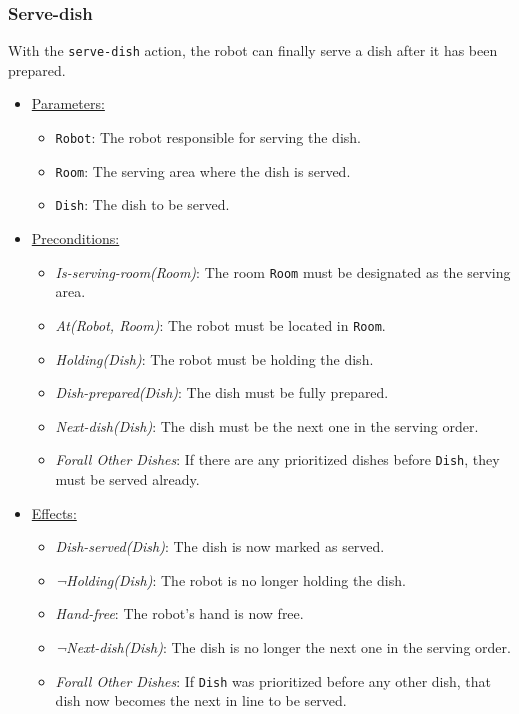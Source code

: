 \documentclass{article}
\begin{document}
\subsubsection{Serve-dish}
With the \texttt{serve-dish} action, the robot can finally serve a dish after it has been prepared.
\begin{itemize}
    \item \underline{Parameters:}
    \begin{itemize}
        \item \texttt{Robot}: The robot responsible for serving the dish.
        \item \texttt{Room}: The serving area where the dish is served.
        \item \texttt{Dish}: The dish to be served.
    \end{itemize}
    \item \underline{Preconditions:}
    \begin{itemize}
        \item \textit{Is-serving-room(Room)}: The room \texttt{Room} must be designated as the serving area.
        \item \textit{At(Robot, Room)}: The robot must be located in \texttt{Room}.
        \item \textit{Holding(Dish)}: The robot must be holding the dish.
        \item \textit{Dish-prepared(Dish)}: The dish must be fully prepared.
        \item \textit{Next-dish(Dish)}: The dish must be the next one in the serving order.
        \item \textit{Forall Other Dishes}: If there are any prioritized dishes before \texttt{Dish}, they must be served already.
    \end{itemize}
    \item \underline{Effects:}
    \begin{itemize}
        \item \textit{Dish-served(Dish)}: The dish is now marked as served.
        \item \textit{¬Holding(Dish)}: The robot is no longer holding the dish.
        \item \textit{Hand-free}: The robot’s hand is now free.
        \item \textit{¬Next-dish(Dish)}: The dish is no longer the next one in the serving order.
        \item \textit{Forall Other Dishes}: If \texttt{Dish} was prioritized before any other dish, that dish now becomes the next in line to be served.
    \end{itemize}
\end{itemize}
\end{document}
